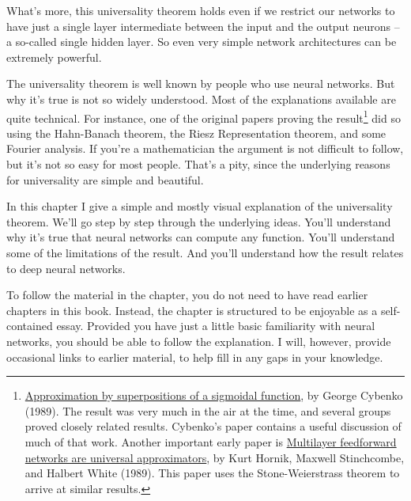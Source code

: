 \documentclass[a4paper,twoside,10pt]{book}
\begin{document}
What's more, this universality theorem holds even if we restrict our networks to have just a single layer intermediate between the input and the output neurons -- a so-called single hidden layer. So even very simple network architectures can be extremely powerful.

The universality theorem is well known by people who use neural networks. But why it's true is not so widely understood. Most of the explanations available are quite technical. For instance, one of the original papers proving the result\footnote{\href{http://www.dartmouth.edu/~gvc/Cybenko_MCSS.pdf}{Approximation by superpositions of a sigmoidal function}, by George Cybenko (1989). The result was very much in the air at the time, and several groups proved closely related results. Cybenko's paper contains a useful discussion of much of that work. Another important early paper is \href{http://www.sciencedirect.com/science/article/pii/0893608089900208}{Multilayer feedforward networks are universal approximators}, by Kurt Hornik, Maxwell Stinchcombe, and Halbert White (1989). This paper uses the Stone-Weierstrass theorem to arrive at similar results.} did so using the Hahn-Banach theorem, the Riesz Representation theorem, and some Fourier analysis. If you're a mathematician the argument is not difficult to follow, but it's not so easy for most people. That's a pity, since the underlying reasons for universality are simple and beautiful.

In this chapter I give a simple and mostly visual explanation of the universality theorem. We'll go step by step through the underlying ideas. You'll understand why it's true that neural networks can compute any function. You'll understand some of the limitations of the result. And you'll understand how the result relates to deep neural networks.

To follow the material in the chapter, you do not need to have read earlier chapters in this book. Instead, the chapter is structured to be enjoyable as a self-contained essay. Provided you have just a little basic familiarity with neural networks, you should be able to follow the explanation. I will, however, provide occasional links to earlier material, to help fill in any gaps in your knowledge.
\end{document}
